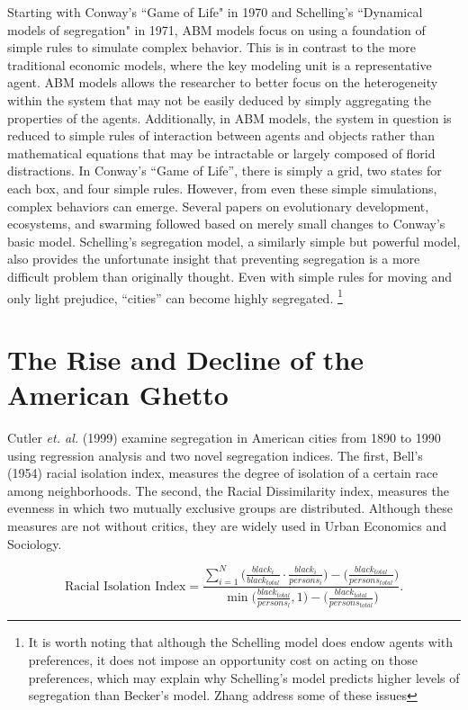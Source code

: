 {Starting with Conway's ``Game of Life" in 1970 and Schelling's ``Dynamical models of segregation" in 1971, ABM models focus on using a foundation of simple rules to simulate complex behavior\cite{conway70,schelling71}. This is in contrast to the more traditional economic models, where the key modeling unit is a representative agent. ABM models allows the researcher to better focus on the heterogeneity within the system that may not be easily deduced by simply aggregating the properties of the agents. Additionally, in ABM models, the system in question is reduced to simple rules of interaction between agents and objects rather than mathematical equations that may be intractable or largely composed of florid distractions. In Conway's ``Game of Life'', there is simply a grid, two states for each box, and four simple rules. However, from even these simple simulations, complex behaviors can emerge. Several papers on evolutionary development, ecosystems, and swarming followed based on merely small changes to Conway's basic model. Schelling's segregation model, a similarly simple but powerful model, also provides the unfortunate insight that preventing segregation is a more difficult problem than originally thought. Even with simple rules for moving and only light prejudice, ``cities'' can become highly segregated\cite{schelling71}. \footnote{It is worth noting that although the Schelling model does endow agents with preferences, it does not impose an opportunity cost on acting on those preferences, which may explain why Schelling's model predicts higher levels of segregation than Becker's model. Zhang address some of these issues\cite{zhang11}}

\section{The Rise and Decline of the American Ghetto}
Cutler \textit{et. al.} (1999) examine segregation in American cities from 1890 to 1990 using regression analysis and two novel segregation indices. The first, Bell's (1954) racial isolation index, measures the degree of isolation of a certain race among neighborhoods\cite{bell54}. The second, the Racial Dissimilarity index, measures the evenness in which two mutually exclusive groups are distributed\cite{duncan55}. Although these measures are not without critics, they are widely used in Urban Economics and Sociology.

\begin{equation}
\label{eq:rii}
\mbox{Racial Isolation Index} = \frac{\sum_{i=1}^N\big(\frac{black_i}{black_{total}}\cdot\frac{black_i}{persons_i}\big)-\big(\frac{black_{total}}{persons_{total}}\big)}{\min\big(\frac{black_{total}}{persons_l},1\big)-\big(\frac{black_{total}}{persons_{total}}\big)} .
\end{equation}

}
